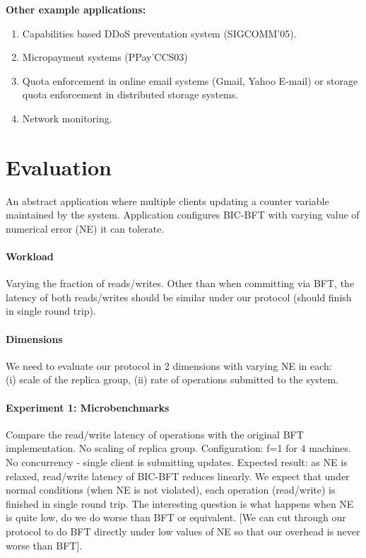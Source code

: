 \documentclass[twocolumn,10pt]{article}
\begin{document}
{\textbf{Other example applications:}
\begin{enumerate}
\item{} Capabilities based DDoS preventation system (SIGCOMM'05).
\item{} Micropayment systems (PPay'CCS03)
\item{} Quota enforcement in online email systems (Gmail, Yahoo E-mail) or storage
quota enforcement in distributed storage systems.
\item{} Network monitoring.
\end{enumerate}
\fi

\section{Evaluation}

An abstract application where multiple clients updating a counter variable
maintained by the system. Application configures BIC-BFT with varying value of
numerical error (NE) it can tolerate. 

\paragraph{Workload} Varying the fraction of reads/writes. Other than when
committing via BFT, the latency of both reads/writes should be similar under
our protocol (should finish in single round trip).


\paragraph{Dimensions} We need to evaluate our protocol in 2 dimensions with
varying NE in each:\\
(i) scale of the replica group, (ii) rate of operations submitted to the system.

\paragraph{Experiment 1: Microbenchmarks} Compare the read/write latency of operations
with the original BFT implementation. No scaling of replica group. 
Configuration: f=1 for 4 machines. No concurrency - single client is submitting
updates. Expected result: as NE is relaxed, read/write latency of BIC-BFT reduces
linearly. We expect that under normal conditions (when NE is not violated), each operation
(read/write) is finished in single round trip. The interesting question is what
happens when NE is quite low, do we do worse than BFT or equivalent. [We can cut
through our protocol to do BFT directly under low values of NE so that our overhead
is never worse than BFT].

}
\end{document}
